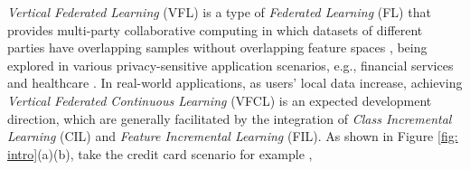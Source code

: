 

\textit{Vertical Federated Learning} (VFL) is a type of \textit{Federated Learning} (FL) that provides multi-party collaborative computing in which datasets of different parties have overlapping samples without overlapping feature spaces \cite{liu2024vertical,castiglia2022compressed,wang2023bdvfl}, being explored in various privacy-sensitive application scenarios, e.g., financial services \cite{liu2023vertical} and healthcare \cite{sakib2024explainable}. 
In real-world applications, as users' local data increase, achieving \textit{Vertical Federated Continuous Learning} (VFCL) is an expected development direction, which are generally facilitated by the integration of \textit{Class Incremental Learning} (CIL) and \textit{Feature Incremental Learning} (FIL).
As shown in Figure \ref{fig: intro}(a)(b), take the credit card scenario for example \cite{author2024},
% 
